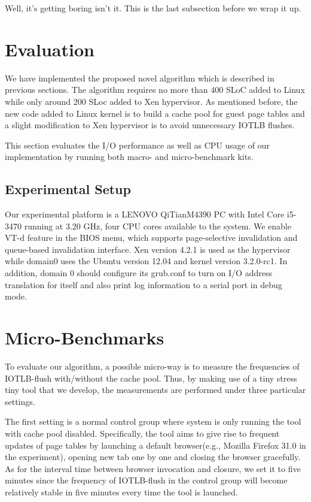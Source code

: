 \documentclass[letterpaper,twocolumn,10pt]{article}
\begin{document}
Well, it's getting boring isn't it.  This is the last subsection
before we wrap it up.

\section{Evaluation}

We have implemented the proposed novel algorithm which is described in previous sections. The algorithm requires no more than $400$ SLoC added to Linux while only around $200$ SLoc added to Xen hypervisor. As mentioned before, the new code added to Linux kernel is to build a cache pool for guest page tables and a slight modification to Xen hypervisor is to avoid unnecessary IOTLB flushes.

This section evaluates the I/O performance as well as CPU usage of our implementation by running both macro- and micro-benchmark kits.

\subsection{Experimental Setup}

Our experimental platform is a LENOVO QiTianM4390 PC with Intel Core i5-3470 running at 3.20 GHz, four CPU cores available to the system. We enable VT-d feature in the BIOS menu, which supports page-selective invalidation and queue-based invalidation interface. Xen version 4.2.1 is used as the hypervisor while domain0 uses the Ubuntu version 12.04 and kernel version 3.2.0-rc1. In addition, domain 0 should configure its grub.conf to turn on I/O address translation for itself and also print log information to a serial port in debug mode.

\section{Micro-Benchmarks}

To evaluate our algorithm, a possible micro-way is to measure the frequencies of IOTLB-flush with/without the cache pool. Thus, by making use of a tiny stress tiny tool that we develop, the measurements are performed under three particular settings.

The first setting is a normal control group where system is only running the tool with cache pool disabled. Specifically, the tool aims to give rise to frequent updates of page tables by launching a default browser(e.g., Mozilla Firefox 31.0 in the experiment), opening new tab one by one and closing the browser gracefully. As for the interval time between browser invocation and closure, we set it to five minutes since the frequency of IOTLB-flush in the control group will become relatively stable in five minutes every time the tool is launched.
\end{document}
